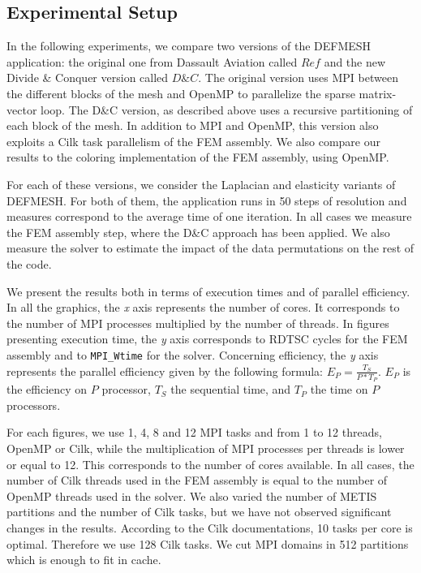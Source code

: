 \documentclass{IOS-Book-Article}
\begin{document}
\subsection{Experimental Setup}


In the following experiments, we compare two versions of the DEFMESH application: the original one from Dassault Aviation called $Ref$ and the new Divide \& Conquer
version called $D\&C$.
The original version uses MPI between the different blocks of the mesh and OpenMP to parallelize the sparse matrix-vector loop.
The D\&C version, as described above uses a recursive partitioning of each block of the mesh.
In addition to MPI and OpenMP, this version also exploits a Cilk task parallelism of the FEM assembly.
We also compare our results to the coloring implementation of the FEM assembly, using OpenMP.

For each of these versions, we consider the Laplacian and elasticity variants of DEFMESH.
For both of them, the application runs in 50 steps of resolution and measures correspond to the average time of one iteration.
In all cases we measure the FEM assembly step, where the D\&C approach has been applied.
We also measure the solver to estimate the impact of the data permutations on the rest of the code.

We present the results both in terms of execution times and of parallel efficiency.
In all the graphics, the \emph{x} axis represents the number of cores. It corresponds to the number of MPI processes multiplied by the number of threads.
In figures presenting execution time, the \emph{y} axis corresponds to RDTSC cycles for the FEM assembly and to \texttt{MPI\_Wtime} for the solver.
Concerning efficiency, the \emph{y} axis represents the parallel efficiency given by the following formula:
$E_{P} = \frac{T_{S}}{P*T_{P}}$. $E_{P}$ is the efficiency on $P$ processor, $T_{S}$ the sequential time, and $T_{P}$ the time on $P$ processors.

For each figures, we use 1, 4, 8 and 12 MPI tasks and from 1 to 12 threads, OpenMP or Cilk, while the multiplication of MPI processes per threads is lower or equal to 12.
This corresponds to the number of cores available. In all cases, the number of Cilk threads used in the FEM assembly is equal to the number of OpenMP threads used in the solver.
We also varied the number of METIS partitions and the number of Cilk tasks, but we have not observed significant changes in the results.
According to the Cilk documentations, 10 tasks per core is optimal. Therefore we use 128 Cilk tasks.
We cut MPI domains in 512 partitions which is enough to fit in cache.
\end{document}
